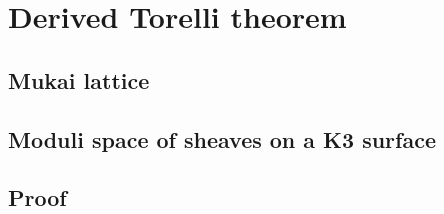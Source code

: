 \section{Derived Torelli theorem}

\subsection{Mukai lattice}
\subsection{Moduli space of sheaves on a K3 surface}
\subsection{Proof}